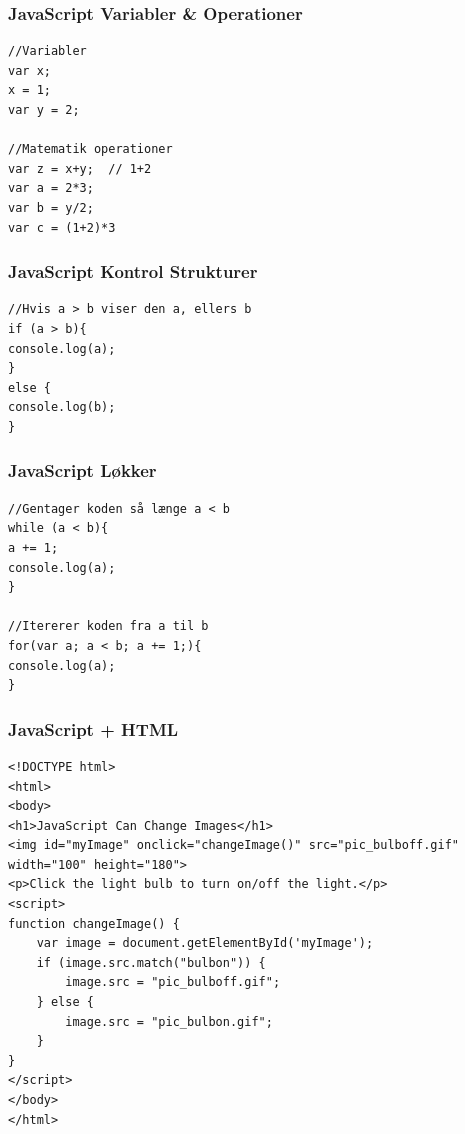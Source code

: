 \documentclass[10pt]{beamer}
\begin{document}
\begin{frame}[fragile]
 \frametitle{JavaScript Variabler \& Operationer}

\begin{lstlisting}
//Variabler
var x;
x = 1;
var y = 2;

//Matematik operationer
var z = x+y;  // 1+2
var a = 2*3;
var b = y/2;
var c = (1+2)*3
\end{lstlisting}
\end{frame}

 
\begin{frame}[fragile]
\frametitle{JavaScript Kontrol Strukturer}
\begin{lstlisting}
//Hvis a > b viser den a, ellers b
if (a > b){
console.log(a);
}
else {
console.log(b);
}
\end{lstlisting}
\end{frame}

\begin{frame}[fragile]
\frametitle{JavaScript Løkker}
\begin{lstlisting}
//Gentager koden så længe a < b
while (a < b){
a += 1;
console.log(a);
}

//Itererer koden fra a til b
for(var a; a < b; a += 1;){
console.log(a);
}
\end{lstlisting}
\end{frame}

\begin{frame}[fragile]
 \frametitle{JavaScript + HTML}
\begin{lstlisting}
<!DOCTYPE html>
<html>
<body>
<h1>JavaScript Can Change Images</h1>
<img id="myImage" onclick="changeImage()" src="pic_bulboff.gif" width="100" height="180">
<p>Click the light bulb to turn on/off the light.</p>
<script>
function changeImage() {
    var image = document.getElementById('myImage');
    if (image.src.match("bulbon")) {
        image.src = "pic_bulboff.gif";
    } else {
        image.src = "pic_bulbon.gif";
    }
}
</script>
</body>
</html>
\end{lstlisting}
\end{frame}
\end{document}

